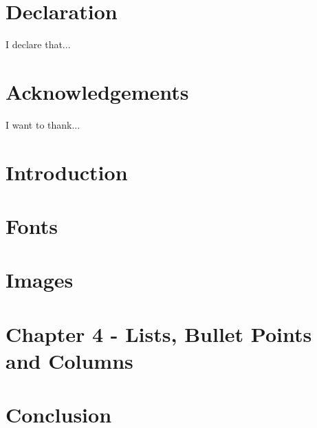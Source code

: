  
\chapter*{Declaration}
I declare that...

 
\chapter*{Acknowledgements}
I want to thank...


\mainmatter %

\chapter{Introduction}
 
\chapter{Fonts}
 
\chapter{Images}
 
\chapter{Chapter 4 - Lists, Bullet Points and Columns}
 
\chapter{Conclusion}

